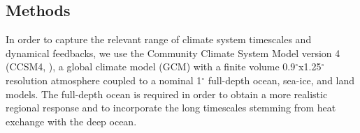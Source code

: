 \documentclass[grl]{AGUTeX}  %
\begin{document}
\begin{article}


%

\section{Methods}

In order to capture the relevant range of climate system timescales and dynamical feedbacks, we use the Community Climate System Model version 4 (CCSM4, \cite{gent11}), a global climate model (GCM) with a finite volume 0.9$^\circ$x1.25$^\circ$ resolution atmosphere coupled to a nominal 1$^\circ$ full-depth ocean, sea-ice, and land models. The full-depth ocean is required in order to obtain a more realistic regional response \citep{mccusker12} and to incorporate the long timescales stemming from heat exchange with the deep ocean. %


\end{article}
\end{document}
